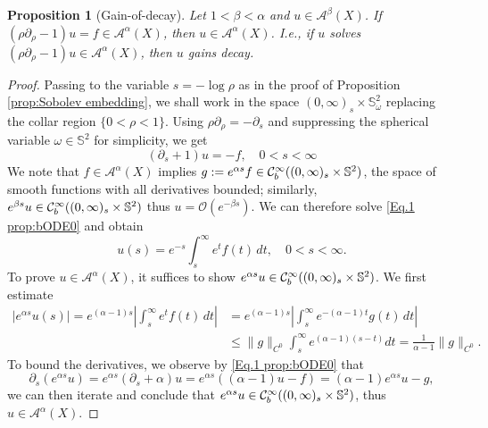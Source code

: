 \documentclass[10pt,a4paper]{amsart}
\newtheorem{proposition}{Proposition}
\newcommand{\A}{\mathcal{A}}
\newcommand{\CI}{\mathcal{C}^\infty}
\renewcommand{\S}{{\mathbb S}}
\newcommand{\pa}{\partial}
\begin{document}
\begin{proposition}[Gain-of-decay]
\label{prop:bODE0}
Let $1<\beta<\alpha$ and $u\in\A^\beta(X)$. If $(\rho\pa_\rho - 1) u = f \in\A^\alpha(X)$, then $u\in\A^\alpha(X)$. I.e., if $u$ solves $(\rho\pa_\rho - 1) u \in\A^\alpha(X)$, then $u$ gains decay.
\end{proposition}

\begin{proof}
Passing to the variable $s=-\log\rho$ as in the proof of Proposition \ref{prop:Sobolev embedding}, we shall work in the space $(0,\infty)_s\times\S_\omega^2$ replacing the collar region $\{0<\rho<1\}$. Using $\rho\pa_\rho = -\pa_s$ and suppressing the spherical variable $\omega\in\S^2$ for simplicity, we get
\begin{equation}
\label{Eq.1 prop:bODE0}
    (\pa_s + 1) u = -f,\quad 0<s<\infty
\end{equation}
We note that $f\in \A^\alpha(X)$ implies $g:=e^{\alpha s}f\in\CI_{\rm b}((0,\infty)_s\times\S^2)$, the space of smooth functions with all derivatives bounded; similarly, $e^{\beta s}u\in \CI_{\rm b}((0,\infty)_s\times\S^2)$ thus $u=\mathcal{O}(e^{-\beta s})$. We can therefore solve \eqref{Eq.1 prop:bODE0} and obtain
\[
    u(s) = e^{-s} \int_s^\infty e^t f(t)\,dt,\quad 0<s<\infty.
\]
To prove $u\in\A^\alpha(X)$, it suffices to show $e^{\alpha s}u \in \CI_{\rm b}((0,\infty)_s\times\S^2)$. We first estimate
\[
\begin{split}
    |e^{\alpha s}u(s)| = e^{(\alpha-1)s} \left| \int_s^\infty e^t f(t)\,dt \right| &= e^{(\alpha-1)s} \left| \int_s^\infty e^{-(\alpha-1)t} g(t)\,dt \right| \\
    &\leq \|g\|_{C^0} \int_s^\infty e^{(\alpha-1)(s-t)} dt = \frac{1}{\alpha-1}\|g\|_{C^0}.
\end{split}
\]
To bound the derivatives, we observe by \eqref{Eq.1 prop:bODE0} that
\[
    \pa_s(e^{\alpha s}u) = e^{\alpha s} (\pa_s +\alpha) u = e^{\alpha s} ((\alpha-1)u - f) = (\alpha-1)e^{\alpha s}u - g,
\]
we can then iterate and conclude that $e^{\alpha s}u \in \CI_{\rm b}((0,\infty)_s\times\S^2)$, thus $u\in\A^\alpha(X)$.
\end{proof}
\end{document}
